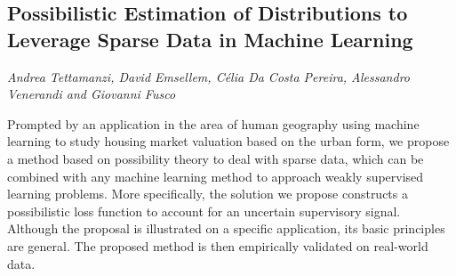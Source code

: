 \documentclass[../booklet.tex]{subfiles}
\begin{document}
\subsection[Possibilistic Estimation of Distributions to Leverage Sparse Data in Machine Learning. {\it Andrea Tettamanzi, David Emsellem, Célia Da Costa Pereira, Alessandro Venerandi and Giovanni Fusco}]{Possibilistic Estimation of Distributions to Leverage Sparse Data in Machine Learning}
    

\begin{center}
  {\it Andrea Tettamanzi, David Emsellem, Célia Da Costa Pereira, Alessandro Venerandi and Giovanni Fusco}
\end{center}

\vskip 0.8cm


Prompted by an application in the area of human geography using machine learning to
study housing market valuation based on the urban form, we propose a method based on
possibility theory to deal with sparse data, which can be combined with any machine learning
method to approach weakly supervised learning problems.
More specifically, the solution we propose constructs a possibilistic
loss function to account for an uncertain supervisory signal.
Although the proposal is illustrated on a specific application, its basic principles
are general. The proposed method is then empirically validated on real-world data.
\end{document}
